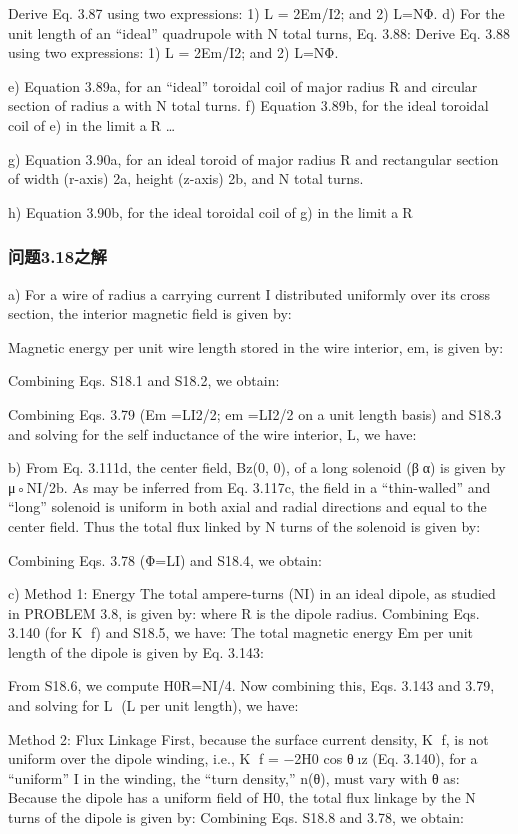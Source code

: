 Derive Eq. 3.87 using two expressions: 1) L = 2Em/I2; and 2) L=NΦ.
d) For the unit length of an “ideal” quadrupole with N total turns, Eq. 3.88:
Derive Eq. 3.88 using two expressions: 1) L = 2Em/I2; and 2) L=NΦ.

e) Equation 3.89a, for an “ideal” toroidal coil of major radius R and circular
section of radius a with N total turns.
f) Equation 3.89b, for the ideal toroidal coil of e) in the limit aR
…%

g) Equation 3.90a, for an ideal toroid of major radius R and rectangular section
of width (r-axis) 2a, height (z-axis) 2b, and N total turns.

h) Equation 3.90b, for the ideal toroidal coil of g) in the limit aR


\subsubsection{问题3.18之解}
a) For a wire of radius a carrying current I distributed uniformly over its cross
section, the interior magnetic field is given by:

Magnetic energy per unit wire length stored in the wire interior, em, is given by:

Combining Eqs. S18.1 and S18.2, we obtain:

Combining Eqs. 3.79 (Em =LI2/2; em =LI2/2 on a unit length basis) and S18.3
and solving for the self inductance of the wire interior, L, we have:

b) From Eq. 3.111d, the center field, Bz(0, 0), of a long solenoid (βα) is given
by μ◦NI/2b. As may be inferred from Eq. 3.117c, the field in a “thin-walled” and
“long” solenoid is uniform in both axial and radial directions and equal to the
center field. Thus the total flux linked by N turns of the solenoid is given by:

Combining Eqs. 3.78 (Φ=LI) and S18.4, we obtain:

c) Method 1: Energy The total ampere-turns (NI) in an ideal dipole, as
studied in PROBLEM 3.8, is given by:
where R is the dipole radius. Combining Eqs. 3.140 (for K f) and S18.5, we have:
The total magnetic energy Em per unit length of the dipole is given by Eq. 3.143:

From S18.6, we compute H0R=NI/4. Now combining this, Eqs. 3.143 and 3.79,
and solving for L (L per unit length), we have:


Method 2: Flux Linkage First, because the surface current density, K f, is
not uniform over the dipole winding, i.e., K f = −2H0 cos θız (Eq. 3.140), for a
“uniform” I in the winding, the “turn density,” n(θ), must vary with θ as:
Because the dipole has a uniform field of H0, the total flux linkage by the N turns
of the dipole is given by:
Combining Eqs. S18.8 and 3.78, we obtain:


